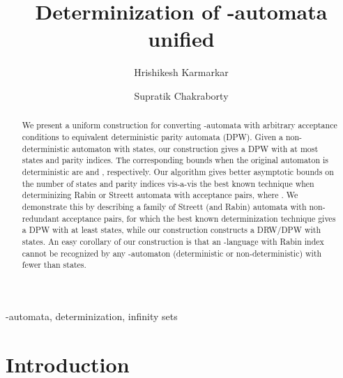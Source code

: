 \documentclass[3p]{elsarticle}
\title{Determinization of -automata unified}
\author[hk]{Hrishikesh Karmarkar}
\author[sc]{Supratik Chakraborty}
\begin{document}
 \thispagestyle{empty}
 \begin{abstract}
 We present a uniform construction for converting -automata
 with arbitrary acceptance conditions to equivalent deterministic
 parity automata (DPW).  Given a non-deterministic automaton with 
 states, our construction gives a DPW with at most 
 states and  parity indices.  The corresponding bounds when the
 original automaton is deterministic are  and ,
 respectively.  Our algorithm gives better asymptotic bounds on the
 number of states and parity indices vis-a-vis the best known technique
 when determinizing Rabin or Streett automata with 
 acceptance pairs, where .  We demonstrate this by describing a
 family of Streett (and Rabin) automata with  non-redundant
 acceptance pairs, for which the best known determinization technique
 gives a DPW with at least  states, while our
 construction constructs a DRW/DPW with  states.
 An easy corollary of our construction is that an
   -language with Rabin index  cannot be recognized by any
   -automaton (deterministic or non-deterministic) with fewer
   than  states.
 \end{abstract}
 \begin{keyword}
-automata, determinization, infinity sets
 \end{keyword}

\maketitle
\section{Introduction}
\end{document}
